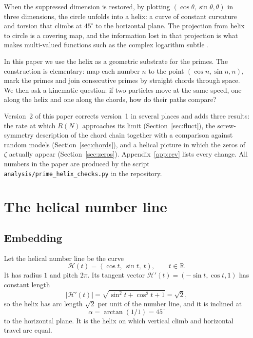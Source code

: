 \documentclass[11pt,a4paper]{article}
\theoremstyle{remark}
\theoremstyle{definition}
\newcommand{\Hc}{\mathcal{H}}
\newcommand{\dg}{^\circ}
\begin{document}
When the suppressed dimension is restored, by plotting $(\cos\theta,\sin\theta,\theta)$ in three dimensions, the circle unfolds into a helix: a curve of constant curvature and torsion that climbs at $45\dg$ to the horizontal plane. The projection from helix to circle is a covering map, and the information lost in that projection is what makes multi-valued functions such as the complex logarithm subtle \cite{ahlfors,needham,weylRS}.

In this paper we use the helix as a geometric substrate for the primes. The construction is elementary: map each number $n$ to the point $(\cos n,\sin n,n)$, mark the primes and join consecutive primes by straight chords through space. We then ask a kinematic question: if two particles move at the same speed, one along the helix and one along the chords, how do their paths compare?

Version~2 of this paper corrects version~1 in several places and adds three results: the rate at which $R(N)$ approaches its limit (Section~\ref{sec:fluct}), the screw-symmetry description of the chord chain together with a comparison against random models (Section~\ref{sec:chords}), and a helical picture in which the zeros of $\zeta$ actually appear (Section~\ref{sec:zeros}). Appendix~\ref{app:rev} lists every change. All numbers in the paper are produced by the script \texttt{analysis/prime\_helix\_checks.py} in the repository.

\section{The helical number line}

\subsection{Embedding}
Let the helical number line be the curve
\begin{equation}
\Hc(t)=(\cos t,\ \sin t,\ t),\qquad t\in\mathbb R .
\end{equation}
It has radius $1$ and pitch $2\pi$. Its tangent vector $\Hc'(t)=(-\sin t,\cos t,1)$ has constant length
\begin{equation}
|\Hc'(t)|=\sqrt{\sin^2t+\cos^2t+1}=\sqrt2 ,
\end{equation}
so the helix has arc length $\sqrt2$ per unit of the number line, and it is inclined at
\begin{equation}
\alpha=\arctan(1/1)=45\dg
\end{equation}
to the horizontal plane. It is the helix on which vertical climb and horizontal travel are equal.
\end{document}
